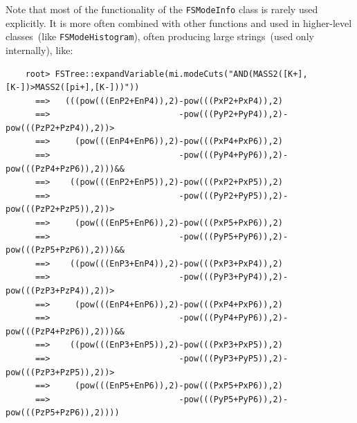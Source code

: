 \documentclass[11pt]{article}
\begin{document}
Note that most of the functionality of the {\tt FSModeInfo} class is rarely used explicitly.  It is more often combined with other functions and used in higher-level classes~(like {\tt FSModeHistogram}), often producing large strings~(used only internally), like:
\begin{verbatim}
    root> FSTree::expandVariable(mi.modeCuts("AND(MASS2([K+],[K-])>MASS2([pi+],[K-]))"))
      ==>   (((pow(((EnP2+EnP4)),2)-pow(((PxP2+PxP4)),2)
      ==>                          -pow(((PyP2+PyP4)),2)-pow(((PzP2+PzP4)),2))>
      ==>     (pow(((EnP4+EnP6)),2)-pow(((PxP4+PxP6)),2)
      ==>                          -pow(((PyP4+PyP6)),2)-pow(((PzP4+PzP6)),2)))&&
      ==>    ((pow(((EnP2+EnP5)),2)-pow(((PxP2+PxP5)),2)
      ==>                          -pow(((PyP2+PyP5)),2)-pow(((PzP2+PzP5)),2))>
      ==>     (pow(((EnP5+EnP6)),2)-pow(((PxP5+PxP6)),2)
      ==>                          -pow(((PyP5+PyP6)),2)-pow(((PzP5+PzP6)),2)))&&
      ==>    ((pow(((EnP3+EnP4)),2)-pow(((PxP3+PxP4)),2)
      ==>                          -pow(((PyP3+PyP4)),2)-pow(((PzP3+PzP4)),2))>
      ==>     (pow(((EnP4+EnP6)),2)-pow(((PxP4+PxP6)),2)
      ==>                          -pow(((PyP4+PyP6)),2)-pow(((PzP4+PzP6)),2)))&&
      ==>    ((pow(((EnP3+EnP5)),2)-pow(((PxP3+PxP5)),2)
      ==>                          -pow(((PyP3+PyP5)),2)-pow(((PzP3+PzP5)),2))>
      ==>     (pow(((EnP5+EnP6)),2)-pow(((PxP5+PxP6)),2)
      ==>                          -pow(((PyP5+PyP6)),2)-pow(((PzP5+PzP6)),2))))
\end{verbatim} 
\end{document}
